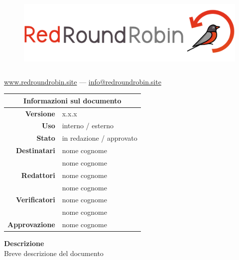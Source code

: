 


\begin{figure}[t!]
    \centering
    \includegraphics[height=10em]{res/images/logo.png}
\end{figure}



\maketitle 
\thispagestyle{empty}



\vspace{-6em}

\begin{center}
    \href{https://www.redroundrobin.site}{www.redroundrobin.site} --- \href{mailto:info@redroundrobin.site}{info@redroundrobin.site}
\end{center}

\vspace{2em}


\begin{table}[ht]
  \begin{center}
    \label{tab:Informazioni_Documento}
    \begin{tabular}{r|l}
        \multicolumn{2}{c}{ \textbf{Informazioni sul documento} } \\
        \hline
    	\textbf{Versione} &  x.x.x \\
		\textbf{Uso} &  interno / esterno \\
        \textbf{Stato} & in redazione / approvato \\
		\textbf{Destinatari}  &
                            nome cognome \\&
                            nome cognome \\
		\textbf{Redattori} & 
                            nome cognome \\&
                            nome cognome \\
		\textbf{Verificatori} &  
                            nome cognome \\&
                            nome cognome \\
		\textbf{Approvazione} &  
                            nome cognome \\
    \end{tabular}
  \end{center}
\end{table}

\vspace{0em}

\begin{center}
    \textbf{Descrizione}\\
    Breve descrizione del documento
\end{center}

